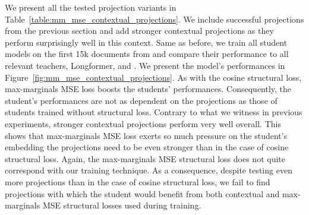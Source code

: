 We present all the tested projection variants in
Table~\ref{table:mm_mse_contextual_projections}. We include successful
projections from the previous section and add stronger contextual projections as
they perform surprisingly well in this context. Same as before, we train all
student models on the first 15k documents from  and compare
their performance to all relevant teachers, Longformer, and
. We present the model's performances in
Figure~\ref{fig:mm_mse_contextual_projections}. As with the cosine
structural loss, max-marginals MSE loss boosts the students' performances.
Consequently, the student's performances are not as dependent on
the projections as those of students trained without 
structural loss. Contrary to what we witness in previous experiments, stronger
contextual projections perform very well overall. This shows that max-marginals MSE loss exerts so much pressure on the student's embedding the projections
need to be even stronger than in the case of cosine structural loss. Again, the max-marginals MSE structural loss does not quite correspond with our
training technique. As a consequence, despite testing even more projections
than in the case of cosine structural loss, we fail to find projections with
which the student would benefit from both contextual and max-marginals MSE
structural losses used during training.

